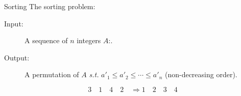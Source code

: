 \begin{frame}{Sorting}
  The sorting problem:
  \begin{description}
	\item[Input:] A sequence of $n$ integers $A$:.
	\item[Output:] A permutation  of $A$ \emph{s.t.} $a'_1 \le a'_2 \le \cdots \le a'_n$ {\small (non-decreasing order)}.
  \end{description}

  \[
	3\quad 1\quad 4\quad 2\quad \Longrightarrow 1\quad 2\quad 3\quad 4
  \]


\end{frame}
